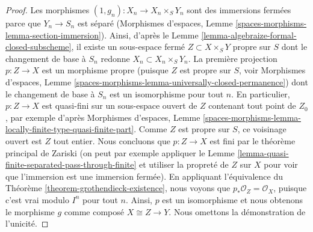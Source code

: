 \begin{proof}
Les morphismes $(1, g_n) : X_n \to X_n \times_S Y_n$ sont des immersions fermées
parce que $Y_n \to S_n$ est séparé
(Morphismes d'espaces, Lemme \ref{spaces-morphisms-lemma-section-immersion}).
Ainsi, d'après le Lemme \ref{lemma-algebraize-formal-closed-subscheme},
il existe un sous-espace fermé $Z \subset X \times_S Y$
propre sur $S$ dont le changement de base à $S_n$ redonne
$X_n \subset X_n \times_S Y_n$. La première projection $p : Z \to X$
est un morphisme propre (puisque $Z$ est propre sur $S$, voir
Morphismes d'espaces, Lemme
\ref{spaces-morphisms-lemma-universally-closed-permanence})
dont le changement de base à $S_n$ est un isomorphisme pour tout $n$.
En particulier, $p : Z \to X$ est quasi-fini sur un sous-espace ouvert
de $Z$ contenant tout point de $Z_0$, par exemple d'après
Morphismes d'espaces, Lemme
\ref{spaces-morphisms-lemma-locally-finite-type-quasi-finite-part}.
Comme $Z$ est propre sur $S$, ce voisinage ouvert est $Z$ tout entier.
Nous concluons que $p : Z \to X$ est fini par le théorème principal de Zariski
(on peut par exemple appliquer le
Lemme \ref{lemma-quasi-finite-separated-pass-through-finite}
et utiliser la propreté de $Z$ sur $X$ pour voir que l'immersion est
une immersion fermée). En appliquant l'équivalence du
Théorème \ref{theorem-grothendieck-existence},
nous voyons que $p_*\mathcal{O}_Z = \mathcal{O}_X$, puisque c'est vrai
modulo $I^n$ pour tout $n$. Ainsi, $p$ est un isomorphisme et nous obtenons
le morphisme $g$ comme composé $X \cong Z \to Y$.
Nous omettons la démonstration de l'unicité.
\end{proof}

